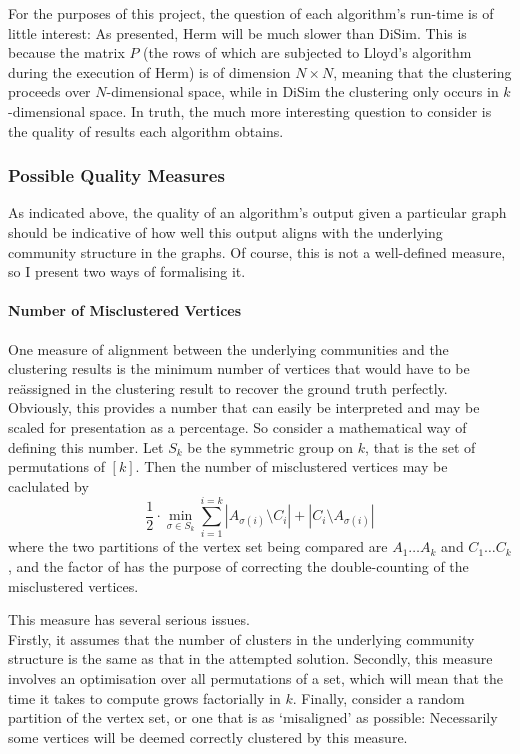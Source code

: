 For the purposes of this project, the question of each algorithm's run-time is of little
interest: As presented, Herm will be much slower than DiSim. This is because the matrix $P$ (the 
rows of which are subjected to Lloyd's algorithm during the execution of Herm) is of dimension $N
\times N$, meaning that the clustering proceeds over $N$-dimensional space, while in DiSim the 
clustering only occurs in $k$-dimensional space. In truth, the much more interesting question to
consider is the quality of results each algorithm obtains. 

\subsubsection{Possible Quality Measures}
As indicated above, the quality of an algorithm's output given a particular graph should be 
indicative of how well this output aligns with the underlying community structure in the graphs. 
Of course, this is not a well-defined measure, so I present two ways of formalising it. 

\paragraph{Number of Misclustered Vertices} 
One measure of alignment between the underlying communities and the clustering 
results is the minimum number of vertices that would have to be re\"assigned in the clustering 
result to recover the ground truth perfectly. Obviously, this provides a number that can easily be 
interpreted and may be scaled for presentation as a percentage. So consider a mathematical way of defining this number. Let $S_k$ be the symmetric
group on $k$, that is the set of permutations of $[k]$. Then the number of misclustered vertices may be caclulated by 
$$
	\frac12 \cdot \min_{\sigma\in S_k} \sum_{i=1}^{i=k} 
	|A_{\sigma(i)} \setminus C_i| + |C_i \setminus A_{\sigma(i)}|
$$
where the two partitions of the vertex set being compared are $A_1\hdots A_k$ and $C_1 \hdots C_k$,
and the factor of  has the purpose of correcting the double-counting of the misclustered 
vertices.

This measure has several serious issues. \\
Firstly, it assumes that the number of clusters in the underlying community structure is the same 
as that in the attempted solution. Secondly, this measure involves an optimisation over all 
permutations of a set, which will mean that the time it takes to compute grows factorially in $k$. 
Finally, consider a random partition of the vertex set, or one that is as `misaligned' as possible: 
Necessarily some vertices will be deemed correctly clustered by this measure. 

